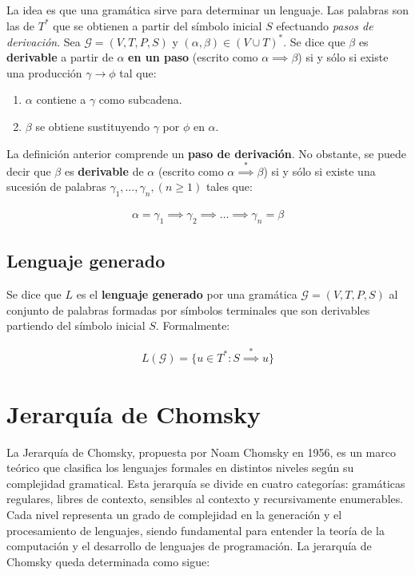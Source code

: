 La idea es que una gramática sirve para determinar un lenguaje. Las palabras son las de $T^*$ que se obtienen a partir del símbolo inicial $S$ efectuando \textit{pasos de derivación}. Sea $\mathcal{G} = (V,T,P,S)$ y $(\alpha,\beta)\in (V \cup T)^*$. Se dice que $\beta$ es \textbf{derivable} a partir de $\alpha$ \textbf{en un paso} (escrito como $\alpha \implies \beta$) si y sólo si existe una producción $\gamma \rightarrow \phi$ tal que:

\begin{enumerate}
    \item $\alpha$ contiene a $\gamma$ como subcadena.
    \item $\beta$ se obtiene sustituyendo $\gamma$ por $\phi$ en $\alpha$.
\end{enumerate}

La definición anterior comprende un \textbf{paso de derivación}. No obstante, se puede decir que $\beta$ es \textbf{derivable} de $\alpha$ (escrito como $\alpha \overset{*}{\implies} \beta$) si y sólo si existe una sucesión de palabras $\gamma_1,\ldots,\gamma_n, (n \geq 1)$ tales que:

\begin{align*}
    \alpha = \gamma_1 \implies \gamma_2 \implies \ldots \implies \gamma_n = \beta
\end{align*}

\subsection{Lenguaje generado}\label{subsection:gramaticalanguage}
Se dice que $L$ es el \textbf{lenguaje generado} por una gramática $\mathcal{G} = (V,T,P,S)$ al conjunto de palabras formadas por símbolos terminales que son derivables partiendo del símbolo inicial $S$. Formalmente:

\begin{align*}
    L(\mathcal{G}) = \lbrace u \in T^* : S \overset{*}{\implies} u \rbrace
\end{align*}

\section{Jerarquía de Chomsky}\label{section:chomsky}
La Jerarquía de Chomsky, propuesta por Noam Chomsky en 1956, es un marco teórico que clasifica los lenguajes formales en distintos niveles según su complejidad gramatical. Esta jerarquía se divide en cuatro categorías: gramáticas regulares, libres de contexto, sensibles al contexto y recursivamente enumerables. Cada nivel representa un grado de complejidad en la generación y el procesamiento de lenguajes, siendo fundamental para entender la teoría de la computación y el desarrollo de lenguajes de programación. La jerarquía de Chomsky queda determinada como sigue:

